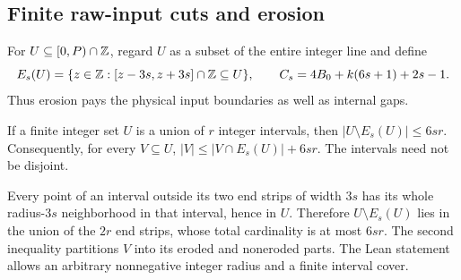 \subsection{Finite raw-input cuts and erosion}

For $U\subseteq[0,P)\cap\mathbb{Z}$, regard $U$ as a subset of the entire integer
line and define
\[
 E_s(U)=\{z\in\mathbb{Z}:[z-3s,z+3s]\cap\mathbb{Z}\subseteq U\},\qquad
 C_s=4B_0+k(6s+1)+2s-1.
\]
Thus erosion pays the physical input boundaries as well as internal gaps.

\begin{lemma}\label{lem:input-erosion}
If a finite integer set $U$ is a union of $r$ integer intervals, then
$|U\setminus E_s(U)|\le6sr$. Consequently, for every $V\subseteq U$,
$|V|\le |V\cap E_s(U)|+6sr$. The intervals need not be disjoint.
\end{lemma}
\begin{outline}
Every point of an interval outside its two end strips of width $3s$ has
its whole radius-$3s$ neighborhood in that interval, hence in $U$.
Therefore $U\setminus E_s(U)$ lies in the union of the $2r$ end strips,
whose total cardinality is at most $6sr$. The second inequality partitions
$V$ into its eroded and noneroded parts. The Lean statement allows an
arbitrary nonnegative integer radius and a finite interval cover.
\end{outline}

